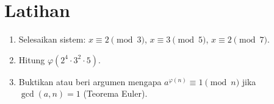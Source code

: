 \documentclass[../main.tex]{subfiles}
\begin{document}
\section{Latihan}
\begin{enumerate}
  \item Selesaikan sistem: \(x\equiv 2\pmod 3\), \(x\equiv 3\pmod 5\), \(x\equiv 2\pmod 7\).
  \item Hitung \(\varphi(2^4\cdot 3^2\cdot 5)\).
  \item Buktikan atau beri argumen mengapa \(a^{\varphi(n)}\equiv 1\pmod n\) jika \(\gcd(a,n)=1\) (Teorema Euler).
\end{enumerate}
\end{document}
